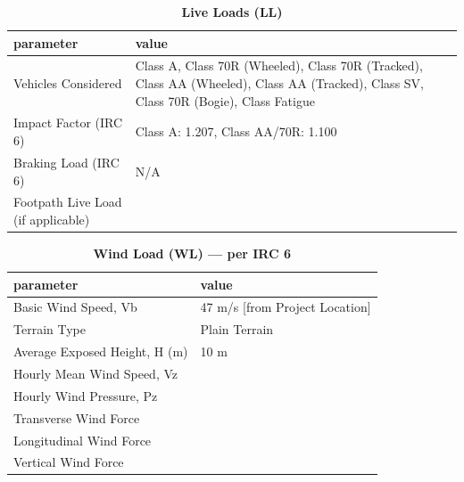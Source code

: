 \documentclass[12pt,a4paper]{report}
\numberwithin{table}{chapter}
\numberwithin{figure}{chapter}
\begin{document}
\vspace{1em}
\begin{longtable}{|L{5.5cm}|p{10.0cm}|}
\caption{\textbf{Live Loads (LL)}}
\hline
\textbf{parameter} & \textbf{value} \\
\hline
\textnormal{Vehicles Considered} & Class A, Class 70R (Wheeled), Class 70R (Tracked), Class AA (Wheeled), Class AA (Tracked), Class SV, Class 70R (Bogie), Class Fatigue \\[6pt]
\hline
\textnormal{Impact Factor (IRC 6)} & Class A:\allowbreak{} 1.207, Class AA/70R:\allowbreak{} 1.100 \\[6pt]
\hline
\textnormal{Braking Load (IRC 6)} & N/A \\[6pt]
\hline
\textnormal{Footpath Live Load (if applicable)} &  \\[6pt]
\hline
\end{longtable}

\vspace{1em}
\begin{longtable}{|L{5.5cm}|p{10.0cm}|}
\caption{\textbf{Wind Load (WL) --- per IRC 6}}
\hline
\textbf{parameter} & \textbf{value} \\
\hline
\textnormal{Basic Wind Speed, Vb} & 47 m/s [from Project Location] \\[6pt]
\hline
\textnormal{Terrain Type} & Plain Terrain \\[6pt]
\hline
\textnormal{Average Exposed Height, H (m)} & 10 m \\[6pt]
\hline
\textnormal{Hourly Mean Wind Speed, Vz} &  \\[6pt]
\hline
\textnormal{Hourly Wind Pressure, Pz} &  \\[6pt]
\hline
\textnormal{Transverse Wind Force} &  \\[6pt]
\hline
\textnormal{Longitudinal Wind Force} &  \\[6pt]
\hline
\textnormal{Vertical Wind Force} &  \\[6pt]
\hline
\end{longtable}
\end{document}
